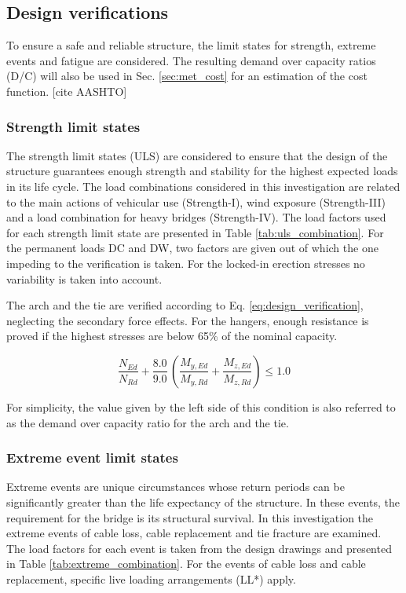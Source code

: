 \newpage
\subsection{Design verifications} \label{sec:met_ver}
To ensure a safe and reliable structure, the limit states for strength, extreme events and fatigue are considered. The resulting demand over capacity ratios (D/C) will also be used in Sec. \ref{sec:met_cost} for an estimation of the cost function. [cite AASHTO]

\subsubsection{Strength limit states}
The strength limit states (ULS) are considered to ensure that the design of the structure guarantees enough strength and stability for the highest expected loads in its life cycle. The load combinations considered in this investigation are related to the main actions of vehicular use (Strength-I), wind exposure (Strength-III) and a load combination for heavy bridges (Strength-IV). The load factors used for each strength limit state are presented in Table \ref{tab:uls_combination}. For the permanent loads DC and DW, two factors are given out of which the one impeding to the verification is taken. For the locked-in erection stresses no variability is taken into account.



The arch and the tie are verified according to Eq. \eqref{eq:design_verification}, neglecting the secondary force effects. For the hangers, enough resistance is proved if the highest stresses are below 65\% of the nominal capacity. 

\begin{equation}
    \frac{N_{Ed}}{N_{Rd}} + \frac{8.0}{9.0}\, \left(\frac{M_{y,Ed}}{M_{y,Rd}}+\frac{M_{z,Ed}}{M_{z,Rd}} \right) \leq 1.0
    \label{eq:design_verification}
\end{equation}

For simplicity, the value given by the left side of this condition is also referred to as the demand over capacity ratio for the arch and the tie.

\subsubsection{Extreme event limit states}
Extreme events are unique circumstances whose return periods can be significantly greater than the life expectancy of the structure. In these events, the requirement for the bridge is its structural survival. In this investigation the extreme events of cable loss, cable replacement and tie fracture are examined. The load factors for each event is taken from the design drawings and presented in Table \ref{tab:extreme_combination}. For the events of cable loss and cable replacement, specific live loading arrangements (LL*) apply.

